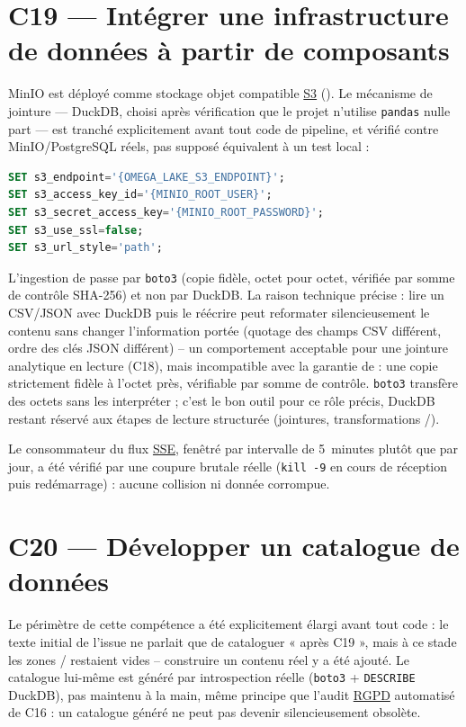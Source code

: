 \section{C19 --- Intégrer une infrastructure de données à partir de composants}

MinIO est déployé comme stockage objet compatible
\hyperref[gloss:s3]{S3}
().
Le mécanisme de jointure --- DuckDB, choisi après vérification que le
projet n'utilise \texttt{pandas} nulle part --- est tranché explicitement
avant tout code de pipeline, et vérifié contre MinIO/PostgreSQL réels,
pas supposé équivalent à un test local :

\begin{lstlisting}[language=SQL,caption={Configuration DuckDB/\texttt{httpfs} pour MinIO (\filepath{src/datacore/storage/lake/transform.py})}]
SET s3_endpoint='{OMEGA_LAKE_S3_ENDPOINT}';
SET s3_access_key_id='{MINIO_ROOT_USER}';
SET s3_secret_access_key='{MINIO_ROOT_PASSWORD}';
SET s3_use_ssl=false;
SET s3_url_style='path';
\end{lstlisting}

L'ingestion de  passe par \texttt{boto3} (copie fidèle,
octet pour octet, vérifiée par somme de contrôle SHA-256) et non par
DuckDB. La raison technique précise : lire un CSV/JSON avec DuckDB puis
le réécrire peut reformater silencieusement le contenu sans changer
l'information portée (quotage des champs CSV différent, ordre des clés
JSON différent) -- un comportement acceptable pour une jointure
analytique en lecture (C18), mais incompatible avec la garantie de
 : une copie strictement fidèle à l'octet près, vérifiable
par somme de contrôle. \texttt{boto3} transfère des octets sans les
interpréter ; c'est le bon outil pour ce rôle précis, DuckDB restant
réservé aux étapes de lecture structurée (jointures, transformations
/).

Le consommateur du flux \hyperref[gloss:sse]{SSE}, fenêtré par
intervalle de 5~minutes plutôt que par jour, a été vérifié par une
coupure brutale réelle (\texttt{kill -9} en cours de réception puis
redémarrage) : aucune collision ni donnée corrompue.

\section{C20 --- Développer un catalogue de données}

Le périmètre de cette compétence a été explicitement élargi avant tout
code : le texte initial de l'issue ne parlait que de cataloguer « après
C19 », mais à ce stade les zones /
restaient vides -- construire un contenu réel y a été ajouté. Le
catalogue lui-même est généré par introspection réelle (\texttt{boto3}
+ \texttt{DESCRIBE} DuckDB), pas maintenu à la main, même principe que
l'audit \hyperref[gloss:rgpd]{RGPD} automatisé de C16 : un catalogue
généré ne peut pas devenir silencieusement obsolète.

